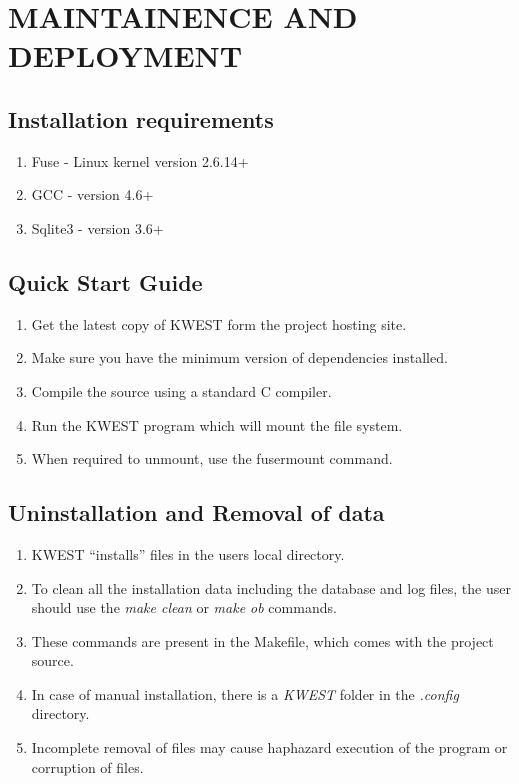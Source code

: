 \chapter{MAINTAINENCE AND DEPLOYMENT}

\section{Installation requirements}

\begin{enumerate}
\item Fuse - Linux kernel version 2.6.14+
\item GCC - version 4.6+
\item Sqlite3 - version 3.6+
\end{enumerate}

\section{Quick Start Guide}
\begin{enumerate}
\item Get the latest copy of KWEST form the project hosting site.
\item Make sure you have the minimum version of dependencies installed.
\item Compile the source using a standard C compiler.
\item Run the KWEST program which will mount the file system.
\item When required to unmount, use the fusermount command.
\end{enumerate}

\section{Uninstallation and Removal of data}
\begin{enumerate}
\item KWEST ``installs'' files in the users local directory.
\item To clean all the installation data including the database and log files, the user should use the \emph{make clean} or \emph{make ob} commands.
\item These commands are present in the Makefile, which comes with the project source.
\item In case of manual installation, there is a \emph{KWEST} folder in the \emph{.config} directory.
\item Incomplete removal of files may cause haphazard execution of the program or corruption of files.
\end{enumerate}

